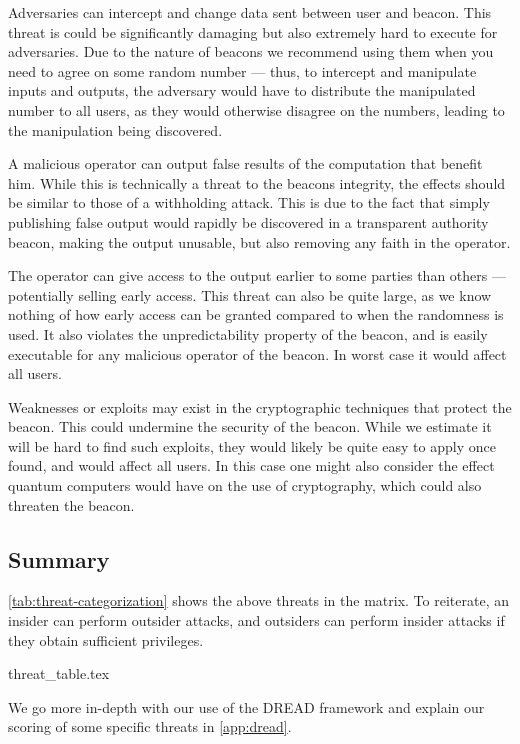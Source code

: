 Adversaries can intercept and change data sent between user and beacon.
This threat is could be significantly damaging but also extremely hard to execute for adversaries.
Due to the nature of beacons we recommend using them when you need to agree on some random number --- thus, to intercept and manipulate inputs and outputs, the adversary would have to distribute the manipulated number to all users, as they would otherwise disagree on the numbers, leading to the manipulation being discovered.

A malicious operator can output false results of the computation that benefit him.
While this is technically a threat to the beacons integrity, the effects should be similar to those of a withholding attack.
This is due to the fact that simply publishing false output would rapidly be discovered in a transparent authority beacon, making the output unusable, but also removing any faith in the operator.

The operator can give access to the output earlier to some parties than others --- potentially selling early access.
This threat can also be quite large, as we know nothing of how early access can be granted compared to when the randomness is used.
It also violates the unpredictability property of the beacon, and is easily executable for any malicious operator of the beacon.
In worst case it would affect all users.

Weaknesses or exploits may exist in the cryptographic techniques that protect the beacon.
This could undermine the security of the beacon.
While we estimate it will be hard to find such exploits, they would likely be quite easy to apply once found, and would affect all users.
In this case one might also consider the effect quantum computers would have on the use of cryptography, which could also threaten the beacon.
\subsection{Summary}

\cref{tab:threat-categorization} shows the above threats in the matrix.
To reiterate, an insider can perform outsider attacks, and outsiders can perform insider attacks if they obtain sufficient privileges.

{threat_table.tex}

We go more in-depth with our use of the DREAD framework and explain our scoring of some specific threats in \cref{app:dread}.